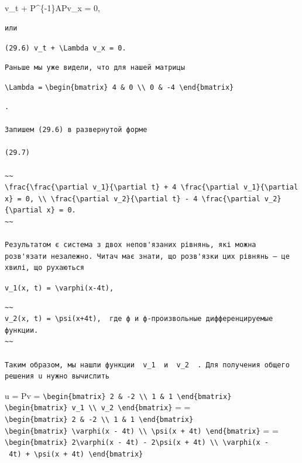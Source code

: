 \documentclass[
  ukrainian,
]{article}
\begin{document}
v\_t + P\^{}\{-1\}APv\_x = 0,

\begin{verbatim}
или
\end{verbatim}

\texttt{(29.6)\ v\_t\ +\ \textbackslash{}Lambda\ v\_x\ =\ 0.}

\begin{verbatim}
Раньше мы уже видели, что для нашей матрицы
\end{verbatim}

\texttt{\textbackslash{}Lambda\ =}
\texttt{\textbackslash{}begin\{bmatrix\}\ 4\ \&\ 0\ \textbackslash{}\textbackslash{}\ 0\ \&\ -4\ \textbackslash{}end\{bmatrix\}}

\begin{verbatim}
.

Запишем (29.6) в развернутой форме

(29.7)

~~
\frac{\frac{\partial v_1}{\partial t} + 4 \frac{\partial v_1}{\partial x} = 0, \\ \frac{\partial v_2}{\partial t} - 4 \frac{\partial v_2}{\partial x} = 0.
~~

Результатом є система з двох непов'язаних рівнянь, які можна розв'язати незалежно. Читач має знати, що розв'язки цих рівнянь — це хвилі, що рухаються
\end{verbatim}

\texttt{v\_1(x,\ t)\ =\ \textbackslash{}varphi(x-4t),}

\begin{verbatim}
~~
v_2(x, t) = \psi(x+4t),  где ф и ф-произвольные дифференцируемые функции.
~~

Таким образом, мы нашли функции  v_1  и  v_2  . Для получения общего решения u нужно вычислить
\end{verbatim}

u = Pv =
\texttt{\textbackslash{}begin\{bmatrix\}\ 2\ \&\ -2\ \textbackslash{}\textbackslash{}\ 1\ \&\ 1\ \textbackslash{}end\{bmatrix\}}
\texttt{\textbackslash{}begin\{bmatrix\}\ v\_1\ \textbackslash{}\textbackslash{}\ v\_2\ \textbackslash{}end\{bmatrix\}}
= =
\texttt{\textbackslash{}begin\{bmatrix\}\ 2\ \&\ -2\ \textbackslash{}\textbackslash{}\ 1\ \&\ 1\ \textbackslash{}end\{bmatrix\}}
\texttt{\textbackslash{}begin\{bmatrix\}\ \textbackslash{}varphi(x\ -\ 4t)\ \textbackslash{}\textbackslash{}\ \textbackslash{}psi(x\ +\ 4t)\ \textbackslash{}end\{bmatrix\}}
= =
\texttt{\textbackslash{}begin\{bmatrix\}\ 2\textbackslash{}varphi(x\ -\ 4t)\ -\ 2\textbackslash{}psi(x\ +\ 4t)\ \textbackslash{}\textbackslash{}\ \textbackslash{}varphi(x\ -\ 4t)\ +\ \textbackslash{}psi(x\ +\ 4t)\ \textbackslash{}end\{bmatrix\}}
\end{document}
